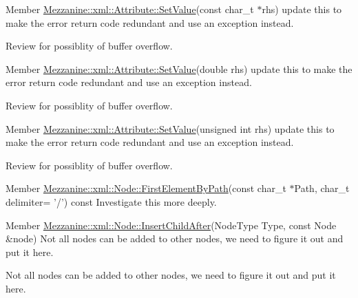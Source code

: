 \label{todo__todo000048}
\hypertarget{todo__todo000048}{}
 
\begin{DoxyDescription}
\item[Member \hyperlink{classMezzanine_1_1xml_1_1Attribute_a850c7d6692ac542ea197952c734e3800}{Mezzanine::xml::Attribute::SetValue}(const char\_\-t $\ast$rhs) ]update this to make the error return code redundant and use an exception instead. 

Review for possiblity of buffer overflow. 
\end{DoxyDescription}

\label{todo__todo000051}
\hypertarget{todo__todo000051}{}
 
\begin{DoxyDescription}
\item[Member \hyperlink{classMezzanine_1_1xml_1_1Attribute_aa6f33397178b9823d85906692320a440}{Mezzanine::xml::Attribute::SetValue}(double rhs) ]update this to make the error return code redundant and use an exception instead. 

Review for possiblity of buffer overflow. 
\end{DoxyDescription}

\label{todo__todo000050}
\hypertarget{todo__todo000050}{}
 
\begin{DoxyDescription}
\item[Member \hyperlink{classMezzanine_1_1xml_1_1Attribute_a3c47acd1ef9cdf05f312fa954cf988a6}{Mezzanine::xml::Attribute::SetValue}(unsigned int rhs) ]update this to make the error return code redundant and use an exception instead. 

Review for possiblity of buffer overflow. 
\end{DoxyDescription}

\label{todo__todo000062}
\hypertarget{todo__todo000062}{}
 
\begin{DoxyDescription}
\item[Member \hyperlink{classMezzanine_1_1xml_1_1Node_a0cc23e97d5ed9b2c1c46fcb442d8b337}{Mezzanine::xml::Node::FirstElementByPath}(const char\_\-t $\ast$Path, char\_\-t delimiter= '/') const  ]Investigate this more deeply. 
\end{DoxyDescription}

\label{todo__todo000060}
\hypertarget{todo__todo000060}{}
 
\begin{DoxyDescription}
\item[Member \hyperlink{classMezzanine_1_1xml_1_1Node_a227829d650b184329245c5abdd0476df}{Mezzanine::xml::Node::InsertChildAfter}(NodeType Type, const Node \&node) ]Not all nodes can be added to other nodes, we need to figure it out and put it here. 

Not all nodes can be added to other nodes, we need to figure it out and put it here. 
\end{DoxyDescription}

